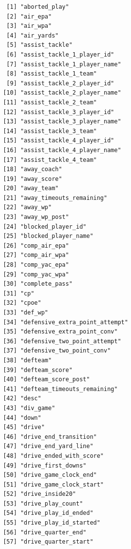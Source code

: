 \documentclass[
  letterpaper,
]{krantz}
\begin{document}
\begin{verbatim}
  [1] "aborted_play"                        
  [2] "air_epa"                             
  [3] "air_wpa"                             
  [4] "air_yards"                           
  [5] "assist_tackle"                       
  [6] "assist_tackle_1_player_id"           
  [7] "assist_tackle_1_player_name"         
  [8] "assist_tackle_1_team"                
  [9] "assist_tackle_2_player_id"           
 [10] "assist_tackle_2_player_name"         
 [11] "assist_tackle_2_team"                
 [12] "assist_tackle_3_player_id"           
 [13] "assist_tackle_3_player_name"         
 [14] "assist_tackle_3_team"                
 [15] "assist_tackle_4_player_id"           
 [16] "assist_tackle_4_player_name"         
 [17] "assist_tackle_4_team"                
 [18] "away_coach"                          
 [19] "away_score"                          
 [20] "away_team"                           
 [21] "away_timeouts_remaining"             
 [22] "away_wp"                             
 [23] "away_wp_post"                        
 [24] "blocked_player_id"                   
 [25] "blocked_player_name"                 
 [26] "comp_air_epa"                        
 [27] "comp_air_wpa"                        
 [28] "comp_yac_epa"                        
 [29] "comp_yac_wpa"                        
 [30] "complete_pass"                       
 [31] "cp"                                  
 [32] "cpoe"                                
 [33] "def_wp"                              
 [34] "defensive_extra_point_attempt"       
 [35] "defensive_extra_point_conv"          
 [36] "defensive_two_point_attempt"         
 [37] "defensive_two_point_conv"            
 [38] "defteam"                             
 [39] "defteam_score"                       
 [40] "defteam_score_post"                  
 [41] "defteam_timeouts_remaining"          
 [42] "desc"                                
 [43] "div_game"                            
 [44] "down"                                
 [45] "drive"                               
 [46] "drive_end_transition"                
 [47] "drive_end_yard_line"                 
 [48] "drive_ended_with_score"              
 [49] "drive_first_downs"                   
 [50] "drive_game_clock_end"                
 [51] "drive_game_clock_start"              
 [52] "drive_inside20"                      
 [53] "drive_play_count"                    
 [54] "drive_play_id_ended"                 
 [55] "drive_play_id_started"               
 [56] "drive_quarter_end"                   
 [57] "drive_quarter_start"                 

\end{verbatim}
\end{document}
